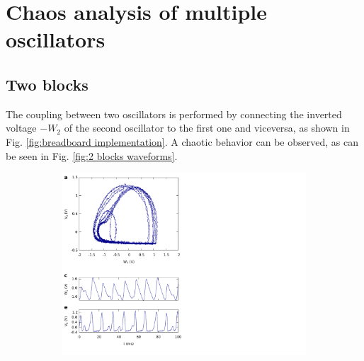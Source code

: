 \chapter{Chaos analysis of multiple oscillators}

\section{Two blocks}

The coupling between two oscillators is performed by connecting
the inverted voltage $-W_2$ of the second oscillator to the
first one and viceversa, as shown in Fig.
\ref{fig:breadboard implementation}. A chaotic behavior can be observed,
as can be seen in Fig. \ref{fig:2 blocks waveforms}.


\begin{figure}[H]
    \centering
    \begin{minipage}{.49\textwidth}
        \begin{subfigure}{\linewidth}
            \centering
            \includegraphics[width=\linewidth,trim={0cm 0 11cm 0},clip,center]
            {../2_blocks/4e4_points/plots/waveforms_1.pdf}
        \end{subfigure}
    \end{minipage}
    \begin{minipage}{.49\textwidth}
        \begin{subfigure}{\linewidth}
            \centering

\end{subfigure}
\end{minipage}
\end{figure}
